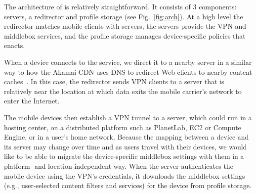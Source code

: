 The architecture of \meddle is relatively straightforward. It consists
of 3 components: \meddle servers, a redirector and profile storage (see Fig.~\ref{fig:arch}). 
At a high level the redirector matches mobile clients with \meddle servers, 
the \meddle servers provide the VPN and middlebox services, and the 
profile storage manages device-specific policies that \meddle enacts.

When a device connects to the service, we direct it to a nearby 
\meddle server in a similar way to how the Akamai CDN uses DNS to redirect 
Web clients to nearby content caches~\cite{akamai:cdn}. 
 In this case, the \meddle redirector sends VPN clients to a 
 server that is relatively near the location at which data exits
the mobile carrier's network to enter the Internet. 

The mobile devices then establish a VPN tunnel to a \meddle server, which
could run in a hosting center, on a distributed platform such as
PlanetLab, EC2 or Compute Engine, or in a user's home network. 
Because the mapping between a device and its \meddle server may change over time and as users
travel with their devices, we would like to be able to migrate the
device-specific middlebox settings with them in a platform- and
location-independent way. 
When the \meddle server authenticates the
mobile device using the VPN's credentials, it downloads  the middlebox
settings (e.g., user-selected content filters and services) for the device from profile storage.


